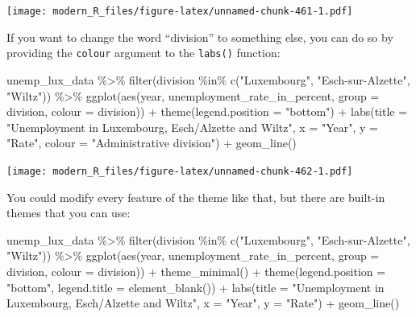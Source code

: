 \documentclass[
]{article}
\newenvironment{Shaded}{\begin{snugshade}}{\end{snugshade}}
\newcommand{\AttributeTok}[1]{\textcolor[rgb]{0.77,0.63,0.00}{#1}}
\newcommand{\FunctionTok}[1]{\textcolor[rgb]{0.00,0.00,0.00}{#1}}
\newcommand{\NormalTok}[1]{#1}
\newcommand{\SpecialCharTok}[1]{\textcolor[rgb]{0.00,0.00,0.00}{#1}}
\newcommand{\StringTok}[1]{\textcolor[rgb]{0.31,0.60,0.02}{#1}}
\begin{document}
\texttt{[image: modern\_R\_files/figure-latex/unnamed-chunk-461-1.pdf]}

If you want to change the word ``division'' to something else, you can do so by providing the \texttt{colour} argument
to the \texttt{labs()} function:

\begin{Shaded}
\begin{Highlighting}[]
\NormalTok{unemp\_lux\_data }\SpecialCharTok{\%\textgreater{}\%}
  \FunctionTok{filter}\NormalTok{(division }\SpecialCharTok{\%in\%} \FunctionTok{c}\NormalTok{(}\StringTok{"Luxembourg"}\NormalTok{, }\StringTok{"Esch{-}sur{-}Alzette"}\NormalTok{, }\StringTok{"Wiltz"}\NormalTok{)) }\SpecialCharTok{\%\textgreater{}\%}
  \FunctionTok{ggplot}\NormalTok{(}\FunctionTok{aes}\NormalTok{(year, unemployment\_rate\_in\_percent, }\AttributeTok{group =}\NormalTok{ division, }\AttributeTok{colour =}\NormalTok{ division)) }\SpecialCharTok{+}
  \FunctionTok{theme}\NormalTok{(}\AttributeTok{legend.position =} \StringTok{"bottom"}\NormalTok{) }\SpecialCharTok{+}
  \FunctionTok{labs}\NormalTok{(}\AttributeTok{title =} \StringTok{"Unemployment in Luxembourg, Esch/Alzette and Wiltz"}\NormalTok{, }\AttributeTok{x =} \StringTok{"Year"}\NormalTok{, }\AttributeTok{y =} \StringTok{"Rate"}\NormalTok{, }\AttributeTok{colour =} \StringTok{"Administrative division"}\NormalTok{) }\SpecialCharTok{+}
  \FunctionTok{geom\_line}\NormalTok{()}
\end{Highlighting}
\end{Shaded}

\texttt{[image: modern\_R\_files/figure-latex/unnamed-chunk-462-1.pdf]}

You could modify every feature of the theme like that, but there are built-in themes that you can use:

\begin{Shaded}
\begin{Highlighting}[]
\NormalTok{unemp\_lux\_data }\SpecialCharTok{\%\textgreater{}\%}
  \FunctionTok{filter}\NormalTok{(division }\SpecialCharTok{\%in\%} \FunctionTok{c}\NormalTok{(}\StringTok{"Luxembourg"}\NormalTok{, }\StringTok{"Esch{-}sur{-}Alzette"}\NormalTok{, }\StringTok{"Wiltz"}\NormalTok{)) }\SpecialCharTok{\%\textgreater{}\%}
  \FunctionTok{ggplot}\NormalTok{(}\FunctionTok{aes}\NormalTok{(year, unemployment\_rate\_in\_percent, }\AttributeTok{group =}\NormalTok{ division, }\AttributeTok{colour =}\NormalTok{ division)) }\SpecialCharTok{+}
  \FunctionTok{theme\_minimal}\NormalTok{() }\SpecialCharTok{+}
  \FunctionTok{theme}\NormalTok{(}\AttributeTok{legend.position =} \StringTok{"bottom"}\NormalTok{, }\AttributeTok{legend.title =} \FunctionTok{element\_blank}\NormalTok{()) }\SpecialCharTok{+}
  \FunctionTok{labs}\NormalTok{(}\AttributeTok{title =} \StringTok{"Unemployment in Luxembourg, Esch/Alzette and Wiltz"}\NormalTok{, }\AttributeTok{x =} \StringTok{"Year"}\NormalTok{, }\AttributeTok{y =} \StringTok{"Rate"}\NormalTok{) }\SpecialCharTok{+}
  \FunctionTok{geom\_line}\NormalTok{()}
\end{Highlighting}
\end{Shaded}
\end{document}
